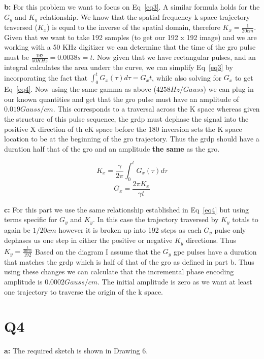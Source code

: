 \documentclass[12pt]{article}
\begin{document}
\noindent\textbf{b: }
For this problem we want to focus on Eq~\ref{eq3}. A similar formula holds for the $G_y$ and $K_y$ relationship. We know that the spatial frequency k space trajectory traversed ($K_x$) is equal to the inverse of the spatial domain, therefore $K_x = \frac{1}{20cm}$. Given that we want to take 192 samples (to get our 192 x 192 image) and we are working with a 50 KHz digitizer we can determine that the time of the gro pulse must be $\frac{192}{50KHz} = 0.0038 s = t$. Now given that we have rectangular pulses, and an integral calculates the area underr the curve, we can simplify Eq~\ref{eq3} by incorporating the fact that $\int_{0}^{t}G_x(\tau)d\tau = G_xt$, while also solving for $G_x$ to get Eq~\ref{eq4}. Now using the same gamma as above ($4258 Hz/Gauss$) we can plug in our known quantities and get that the gro pulse must have an amplitude of $0.019 Gauss/cm$. This corresponds to a traversal across the K space whereas given the structure of this pulse sequence, the grdp must dephase the signal into the positive X direction of th eK space before the 180 inversion sets the K space location to be at the beginning of the gro trajectory. Thus the grdp should have a duration half that of the gro and an amplitude \textbf{the same} as the gro. 

\begin{equation}
K_x = \frac{\gamma}{2\pi} \int_{0}^{t}G_x(\tau)d\tau
\label{eq3}
\end{equation}
\begin{equation}
G_x = \frac{2\pi K_x}{\gamma t}
\label{eq4}
\end{equation}

\noindent\textbf{c: }
For this part we use the same relationship established in Eq~\ref{eq4} but using terms specific for $G_y$ and $K_y$. In this case the trajectory traversed by $K_y$ totals to again be $1/20cm$ however it is broken up into 192 steps as each $G_y$ pulse only dephases us one step in either the positive or negative $K_y$ directions. Thus $K_y = \frac{\frac{1}{20 cm}}{192}$ Based on the diagram I assume that the $G_y$ gpe pulses have a duration that matches the grdp which is half of that of the gro as defined in part b. Thus using these changes we can calculate that the incremental phase encoding amplitude is $0.0002 Gauss/cm$. The initial amplitude is zero as we want at least one trajectory to traverse the origin of the k space.
	

\section{Q4}
\noindent\textbf{a: }
The required sketch is shown in Drawing 6.
\end{document}
